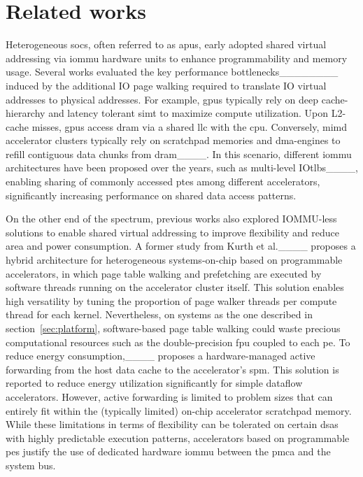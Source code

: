 \section{Related works}
Heterogeneous \glspl{soc}, often referred to as \glspl{apu}, early adopted shared virtual addressing via \gls{iommu} hardware units to enhance programmability and memory usage. Several works evaluated the key performance bottlenecks________ induced by the additional IO page walking required to translate IO virtual addresses to physical addresses. For example, \glspl{gpu} typically rely on deep cache-hierarchy and latency tolerant \gls{simt} to maximize compute utilization. Upon L2-cache misses, \glspl{gpu} access \gls{dram} via a shared \gls{llc} with the \gls{cpu}. Conversely, \gls{mimd} accelerator clusters typically rely on scratchpad memories and \gls{dma}-engines to refill contiguous data chunks from \gls{dram}____. In this scenario, different \gls{iommu} architectures have been proposed over the years, such as multi-level IO\glspl{tlb}____, enabling sharing of commonly accessed \glspl{pte} among different accelerators, significantly increasing performance on shared data access patterns.

On the other end of the spectrum, previous works also explored IOMMU-less solutions to enable shared virtual addressing to improve flexibility and reduce area and power consumption. A former study from Kurth et al.____ proposes a hybrid architecture for heterogeneous systems-on-chip based on programmable accelerators, in which page table walking and prefetching are executed by software threads running on the accelerator cluster itself. This solution enables high versatility by tuning the proportion of page walker threads per compute thread for each kernel. Nevertheless, on systems as the one described in section~\ref{sec:platform}, software-based page table walking could waste precious computational resources such as the double-precision \gls{fpu} coupled to each \gls{pe}. To reduce energy consumption,____ proposes a hardware-managed active forwarding from the host data cache to the accelerator's \gls{spm}. This solution is reported to reduce energy utilization significantly for simple dataflow accelerators. However, active forwarding is limited to problem sizes that can entirely fit within the (typically limited) on-chip accelerator scratchpad memory. While these limitations in terms of flexibility can be tolerated on certain \glspl{dsa} with highly predictable execution patterns, accelerators based on programmable \glspl{pe} justify the use of dedicated hardware \gls{iommu} between the \gls{pmca} and the system bus.

